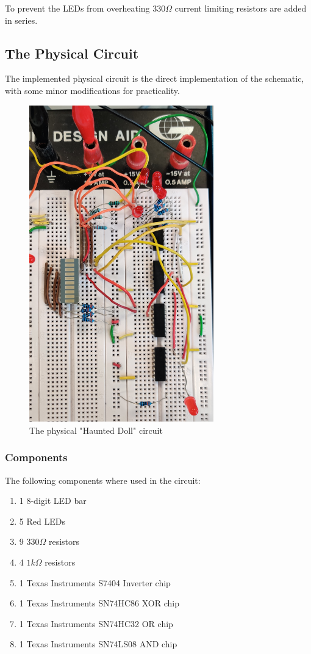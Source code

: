 \documentclass[14pt]{article}
\begin{document}
To prevent the LEDs from overheating $330\Omega$ current limiting resistors are added in series.

\clearpage
\subsection{The Physical Circuit}

The implemented physical circuit is the direct implementation of the schematic, with some minor modifications for practicality.

\begin{figure}[H]
  \centering
  \includegraphics[width=8cm]{./images/circuit.jpg}
  \caption{The physical "Haunted Doll" circuit}
  \label{fig:circuit}
\end{figure}

\subsubsection{Components}

The following components where used in the circuit:

\begin{enumerate}
  \item 1 8-digit LED bar
  \item 5 Red LEDs
  \item 9 $330\Omega$ resistors
  \item 4 $1k\Omega$ resistors
  \item 1 Texas Instruments S7404 Inverter chip\autocite{ti:7404}
  \item 1 Texas Instruments SN74HC86 XOR chip\autocite{ti:7486}
  \item 1 Texas Instruments SN74HC32 OR chip\autocite{ti:7432}
  \item 1 Texas Instruments SN74LS08 AND chip\autocite{ti:7408}
\end{enumerate}
\end{document}

